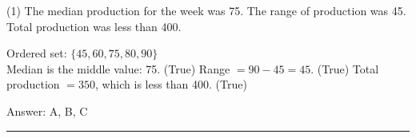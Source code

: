 \documentclass[11pt,paper=a4,answers]{exam}
\begin{document}
\begin{questions}
\begin{tasks}(1)
\task[A)] The median production for the week was 75.
\task[B)] The range of production was 45.
\task[C)] Total production was less than 400.
\end{tasks}

\begin{solution}
\begin{center}
Ordered set: $\{45, 60, 75, 80, 90\}$ \\
Median is the middle value: 75. (True)
\vspace{5pt}
Range $= 90 - 45 = 45$. (True)
\vspace{5pt}
Total production $= 350$, which is less than 400. (True)
\end{center}

Answer: \colorbox{yellow!100}{A, B, C}
\end{solution}


\end{questions}
\begin{center}
\rule{.5\textwidth}{1pt}
\end{center}
\end{document}
